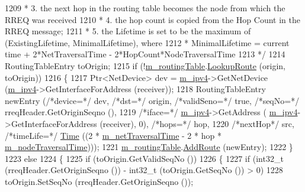 \begin{DoxyCode}
1209 \textcolor{comment}{   *  3. the next hop in the routing table becomes the node from which the  RREQ was received}
1210 \textcolor{comment}{   *  4. the hop count is copied from the Hop Count in the RREQ message;}
1211 \textcolor{comment}{   *  5. the Lifetime is set to be the maximum of (ExistingLifetime, MinimalLifetime), where}
1212 \textcolor{comment}{   *     MinimalLifetime = current time + 2*NetTraversalTime - 2*HopCount*NodeTraversalTime}
1213 \textcolor{comment}{   */}
1214   RoutingTableEntry toOrigin;
1215   \textcolor{keywordflow}{if} (!\hyperlink{classns3_1_1aodv_1_1RoutingProtocol_a4e1003a34c8adc96db71096d88c98ae0}{m\_routingTable}.\hyperlink{classns3_1_1aodv_1_1RoutingTable_a90cbc8a2c65cd68ccdaf768fcbb5d723}{LookupRoute} (origin, toOrigin))
1216     \{
1217       Ptr<NetDevice> dev = \hyperlink{classns3_1_1aodv_1_1RoutingProtocol_aee33006b1f9d8b24d4722037ff3fec98}{m\_ipv4}->GetNetDevice (\hyperlink{classns3_1_1aodv_1_1RoutingProtocol_aee33006b1f9d8b24d4722037ff3fec98}{m\_ipv4}->GetInterfaceForAddress (receiver));
1218       RoutingTableEntry newEntry (\textcolor{comment}{/*device=*/} dev, \textcolor{comment}{/*dst=*/} origin, \textcolor{comment}{/*validSeno=*/} \textcolor{keyword}{true}, \textcolor{comment}{/*seqNo=*/} 
      rreqHeader.GetOriginSeqno (),
1219                                               \textcolor{comment}{/*iface=*/} \hyperlink{classns3_1_1aodv_1_1RoutingProtocol_aee33006b1f9d8b24d4722037ff3fec98}{m\_ipv4}->GetAddress (
      \hyperlink{classns3_1_1aodv_1_1RoutingProtocol_aee33006b1f9d8b24d4722037ff3fec98}{m\_ipv4}->GetInterfaceForAddress (receiver), 0), \textcolor{comment}{/*hops=*/} hop,
1220                                               \textcolor{comment}{/*nextHop*/} src, \textcolor{comment}{/*timeLife=*/} 
      \hyperlink{namespacens3_1_1TracedValueCallback_a7ffd3e7c142ffe7c8a1d2db9b8de38ec}{Time} ((2 * \hyperlink{classns3_1_1aodv_1_1RoutingProtocol_a4642e67ba68a7ef40405f5773650ea1a}{m\_netTraversalTime} - 2 * hop * 
      \hyperlink{classns3_1_1aodv_1_1RoutingProtocol_ad467863779ea1559ad5942ff6c24a706}{m\_nodeTraversalTime})));
1221       \hyperlink{classns3_1_1aodv_1_1RoutingProtocol_a4e1003a34c8adc96db71096d88c98ae0}{m\_routingTable}.\hyperlink{classns3_1_1aodv_1_1RoutingTable_a579e562e38e67d510de1ff2c87806c76}{AddRoute} (newEntry);
1222     \}
1223   \textcolor{keywordflow}{else}
1224     \{
1225       \textcolor{keywordflow}{if} (toOrigin.GetValidSeqNo ())
1226         \{
1227           \textcolor{keywordflow}{if} (int32\_t (rreqHeader.GetOriginSeqno ()) - int32\_t (toOrigin.GetSeqNo ()) > 0)
1228             toOrigin.SetSeqNo (rreqHeader.GetOriginSeqno ());

\end{DoxyCode}
